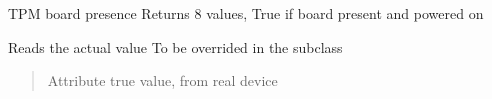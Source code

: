 \documentclass[letterpaper,10pt,english]{sphinxmanual}
\begin{document}
\begin{fulllineitems}
\label{\detokenize{webserverdocs:subrack_hardware.TpmPresent}}
\pysigstartsignatures
{}
\pysigstopsignatures
\sphinxAtStartPar
TPM board presence
Returns 8 values, True if board present and powered on

\begin{fulllineitems}
\label{\detokenize{webserverdocs:subrack_hardware.TpmPresent.read_value}}
\pysigstartsignatures
{}
\pysigstopsignatures
\sphinxAtStartPar
Reads the actual value
To be overrided in the subclass
\begin{quote}\begin{description}
\sphinxAtStartPar
Attribute true value, from real device

\end{description}\end{quote}

\end{fulllineitems}


\end{fulllineitems}

\end{document}
